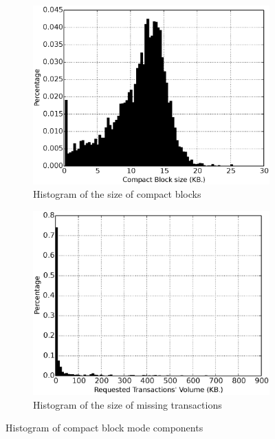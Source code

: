  \begin{figure}[!t]
\begin{subfigure}{.48\linewidth}
\centering
\includegraphics[width=\linewidth]{image/cmpctblock_traffic_volume.eps}
\caption{Histogram of the size of compact blocks}
\label{fig:cmpctblock_traffic_volume}
\end{subfigure}
\centering
\begin{subfigure}{.48\linewidth}
\includegraphics[width=\linewidth]{image/blocktxn_volume.eps}
\caption{Histogram of the size of missing transactions}
\label{fig:blocktxn_volume}
\end{subfigure}
\caption{Histogram of compact block mode components}
\label{fig:hist_cmp_component}
\end{figure}

